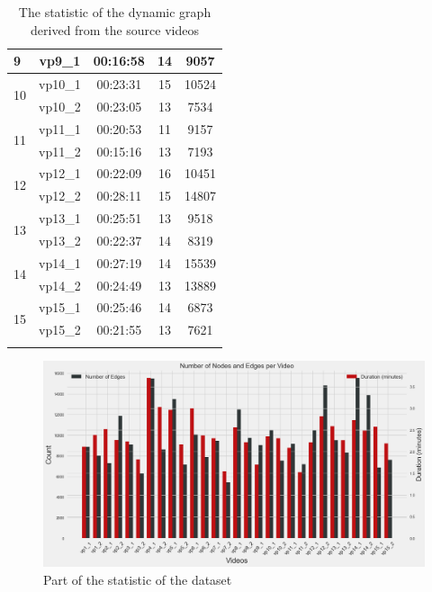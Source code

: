 \begin{longtable}{lcccc}
        \midrule
    9                   & vp9\_1   & 00:16:58                     & 14    &9057          \\
        \midrule
    \multirow{2}{*}{10} & vp10\_1  & 00:23:31                     & 15    &10524          \\
                        & vp10\_2  & 00:23:05                     & 13    &7534          \\
        \midrule
    \multirow{2}{*}{11} & vp11\_1  & 00:20:53                     & 11    &9157          \\
                        & vp11\_2  & 00:15:16                     & 13    &7193          \\
        \midrule
    \multirow{2}{*}{12} & vp12\_1  & 00:22:09                     & 16    &10451          \\
                        & vp12\_2  & 00:28:11                     & 15    &14807          \\
        \midrule
    \multirow{2}{*}{13} & vp13\_1  & 00:25:51                     & 13    &9518          \\
                        & vp13\_2  & 00:22:37                     & 14    &8319          \\
        \midrule
    \multirow{2}{*}{14} & vp14\_1  & 00:27:19                     & 14    &15539          \\
                        & vp14\_2  & 00:24:49                     & 13    &13889          \\
        \midrule
    \multirow{2}{*}{15} & vp15\_1  & 00:25:46                     & 14    &6873          \\
                        & vp15\_2  & 00:21:55                     & 13    &7621          \\
        \bottomrule

    \caption{The statistic of the dynamic graph derived from the source videos}
    \label{tab:dataset_statistic}
\end{longtable}

\clearpage
\begin{figure}[h]
    \centering
    \includegraphics[width=\textwidth]{figures/05_data_statistic.png}
    \caption{Part of the statistic of the dataset}
    \label{fig:dataset_statistic}
\end{figure}

